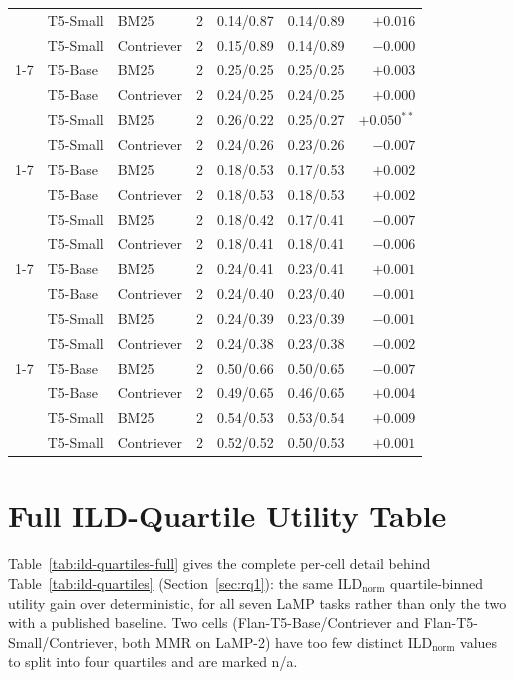 \documentclass[10pt,twocolumn]{article}
\begin{document}
\begin{table}[t]
\begin{tabular}{@{}lllrllr@{}}
 & T5-Small & BM25 & 2 & 0.14/0.87 & 0.14/0.89 & $+0.016$ \\
 & T5-Small & Contriever & 2 & 0.15/0.89 & 0.14/0.89 & $-0.000$ \\
\cmidrule(lr){1-7}
\multirow{4}{*}{LaMP-4} & T5-Base & BM25 & 2 & 0.25/0.25 & 0.25/0.25 & $+0.003$ \\
 & T5-Base & Contriever & 2 & 0.24/0.25 & 0.24/0.25 & $+0.000$ \\
 & T5-Small & BM25 & 2 & 0.26/0.22 & 0.25/0.27 & $+0.050^{**}$ \\
 & T5-Small & Contriever & 2 & 0.24/0.26 & 0.23/0.26 & $-0.007$ \\
\cmidrule(lr){1-7}
\multirow{4}{*}{LaMP-5} & T5-Base & BM25 & 2 & 0.18/0.53 & 0.17/0.53 & $+0.002$ \\
 & T5-Base & Contriever & 2 & 0.18/0.53 & 0.18/0.53 & $+0.002$ \\
 & T5-Small & BM25 & 2 & 0.18/0.42 & 0.17/0.41 & $-0.007$ \\
 & T5-Small & Contriever & 2 & 0.18/0.41 & 0.18/0.41 & $-0.006$ \\
\cmidrule(lr){1-7}
\multirow{4}{*}{LaMP-6} & T5-Base & BM25 & 2 & 0.24/0.41 & 0.23/0.41 & $+0.001$ \\
 & T5-Base & Contriever & 2 & 0.24/0.40 & 0.23/0.40 & $-0.001$ \\
 & T5-Small & BM25 & 2 & 0.24/0.39 & 0.23/0.39 & $-0.001$ \\
 & T5-Small & Contriever & 2 & 0.24/0.38 & 0.23/0.38 & $-0.002$ \\
\cmidrule(lr){1-7}
\multirow{4}{*}{LaMP-7} & T5-Base & BM25 & 2 & 0.50/0.66 & 0.50/0.65 & $-0.007$ \\
 & T5-Base & Contriever & 2 & 0.49/0.65 & 0.46/0.65 & $+0.004$ \\
 & T5-Small & BM25 & 2 & 0.54/0.53 & 0.53/0.54 & $+0.009$ \\
 & T5-Small & Contriever & 2 & 0.52/0.52 & 0.50/0.53 & $+0.001$ \\
\bottomrule
\end{tabular}
\end{table}

\section{Full ILD-Quartile Utility Table}
\label{app:ild-quartiles-full}

Table~\ref{tab:ild-quartiles-full} gives the complete per-cell detail behind
Table~\ref{tab:ild-quartiles} (Section~\ref{sec:rq1}): the same ILD$_{\text{norm}}$
quartile-binned utility gain over deterministic, for all seven LaMP tasks rather
than only the two with a published baseline. Two cells (Flan-T5-Base/Contriever and
Flan-T5-Small/Contriever, both MMR on LaMP-2) have too few distinct
ILD$_{\text{norm}}$ values to split into four quartiles and are marked n/a.
\end{document}
